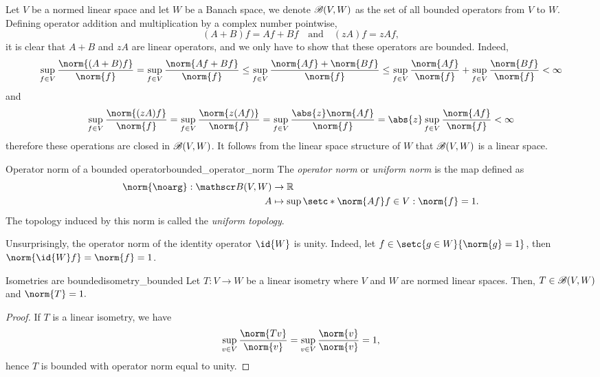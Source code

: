 Let \(V\) be a normed linear space and let \(W\) be a Banach space, we denote \(\mathscr{B}(V,W)\) as the set of all bounded operators from \(V\) to \(W\). Defining operator addition and multiplication by a complex number pointwise,
\begin{equation*}
    (A + B)f = Af + Bf\quad\text{and}\quad (zA)f = zAf,
\end{equation*}
it is clear that \(A+B\) and \(zA\) are linear operators, and we only have to show that these operators are bounded. Indeed,
\begin{equation*}
    \sup_{f \in V} \frac{\norm{(A+B)f}}{\norm{f}} = \sup_{f\in V} \frac{\norm{Af + Bf}}{\norm{f}} \leq \sup_{f \in V} \frac{\norm{Af} + \norm{Bf}}{\norm{f}} \leq \sup_{f\in V} \frac{\norm{Af}}{\norm{f}} + \sup_{f\in V} \frac{\norm{Bf}}{\norm{f}} < \infty
\end{equation*}
and
\begin{align*}
    \sup_{f \in V} \frac{\norm{(zA)f}}{\norm{f}} = \sup_{f \in V} \frac{\norm{z(Af)}}{\norm{f}} = \sup_{f \in V} \frac{\abs{z}\norm{Af}}{\norm{f}} = \abs{z} \sup_{f \in V} \frac{\norm{Af}}{\norm{f}} < \infty
\end{align*}
therefore these operations are closed in \(\mathscr{B}(V, W)\). It follows from the linear space structure of \(W\) that \(\mathscr{B}(V, W)\) is a linear space.
\begin{definition}{Operator norm of a bounded operator}{bounded_operator_norm}
    The \emph{operator norm} or \emph{uniform norm} is the map defined as
    \begin{align*}
        \norm{\noarg} : \bounded(V, W) &\to \mathbb{R}\\
        A &\mapsto \sup{\setc*{\norm{Af}}{f \in V : \norm{f} = 1}}.
    \end{align*}
    The topology induced by this norm is called the \emph{uniform topology}.
\end{definition}
\begin{remark}
    Unsurprisingly, the operator norm of the identity operator \(\id{W}\) is unity. Indeed, let \(f \in \setc{g \in W}{\norm{g} = 1}\), then \(\norm{\id{W}f} = \norm{f} = 1\).
\end{remark}

\begin{proposition}{Isometries are bounded}{isometry_bounded}
    Let \(T : V \to W\) be a linear isometry where \(V\) and \(W\) are normed linear spaces. Then, \(T \in \mathscr{B}(V,W)\) and \(\norm{T} = 1.\)
\end{proposition}
\begin{proof}
    If \(T\) is a linear isometry, we have
    \begin{equation*}
        \sup_{v \in V} \frac{\norm{Tv}}{\norm{v}} = \sup_{v \in V} \frac{\norm{v}}{\norm{v}} = 1,
    \end{equation*}
    hence \(T\) is bounded with operator norm equal to unity.
\end{proof}

